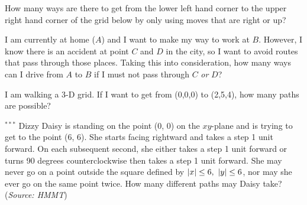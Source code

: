 \begin{problem}
 How many ways are there to get from the lower left hand corner to the upper right hand corner of the grid below by only using moves that are right or up?
 \begin{center}
\end{center}
\end{problem}

\begin{problem}
 I am currently at home ($A$) and I want to make my way to work at $B$. However, I know there is an accident at point $C$ and $D$ in the city, so I want to avoid routes that pass through those places. Taking this into consideration, how many ways can I drive from $A$ to $B$ if I must not pass through $C$ \textit{or} $D$?
 \begin{center}
\end{center}
 \end{problem}

\begin{problem}
I am walking a 3-D grid. If I want to get from (0,0,0) to (2,5,4), how many paths are possible?
\end{problem}

\begin{problem}
$^{\ast \ast \ast}$ Dizzy Daisy is standing on the point (0, 0) on the $xy$-plane and is trying to get to the point (6, 6). She starts facing rightward and takes a step 1 unit forward. On each subsequent second, she either takes a step 1 unit forward or turns 90 degrees counterclockwise then takes a step 1 unit forward. She may never go on a point outside the square defined by $\abs{x} \leq 6, \,\, \abs{y} \leq 6$, nor may she ever go on the same point twice. How many different paths may Daisy take? (\textit{Source: HMMT})
\end{problem}